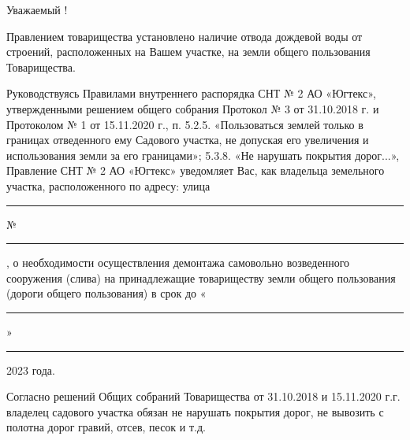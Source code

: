 \begin{center}
	Уважаемый  !
\end{center}
%
Правлением товарищества установлено наличие  отвода дождевой воды  от строений, расположенных на Вашем участке, на земли общего пользования Товарищества.  


Руководствуясь Правилами внутреннего распорядка СНТ № 2 АО «Югтекс», утвержденными решением общего собрания Протокол № 3 от 31.10.2018 г. и Протоколом № 1 от 15.11.2020 г., п. 5.2.5. «Пользоваться землей только в границах отведенного ему Садового участка, не допуская его увеличения и использования земли за его границами»; 5.3.8. «Не нарушать покрытия дорог...», Правление СНТ № 2 АО «Югтекс» уведомляет Вас, как владельца земельного участка, расположенного по адресу:                                            улица \rule{5cm}{0.1 mm} № \rule{1cm}{0.1 mm} , о  необходимости осуществления демонтажа самовольно возведенного сооружения (слива) на принадлежащие товариществу земли общего пользования (дороги общего пользования) в срок  до «\rule{8mm}{0.1 mm}»\rule{4cm}{0.1 mm} 2023 года.  


%
Согласно решений Общих собраний Товарищества от 31.10.2018 и 15.11.2020 г.г. владелец садового участка обязан не нарушать покрытия дорог, не вывозить с полотна дорог гравий, отсев, песок и т.д. 


%




